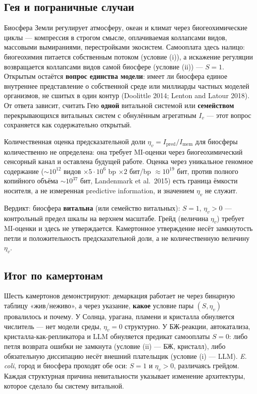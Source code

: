 \documentclass[pdflatex,sn-mathphys-ay]{sn-jnl}
\begin{document}
\subsection{Гея и пограничные случаи}\label{ux433ux435ux44f-ux438-ux43fux43eux433ux440ux430ux43dux438ux447ux43dux44bux435-ux441ux43bux443ux447ux430ux438}

Биосфера Земли регулирует атмосферу, океан и климат через биогеохимические циклы --- компрессия в строгом смысле, оплачиваемая коллапсами видов, массовыми вымираниями, перестройками экосистем. Самооплата здесь налицо: биогеохимия питается собственным потоком (условие (i)), а искажение регуляции возвращается коллапсами видов самой биосфере (условие (ii)) --- \(S = 1\). Открытым остаётся \textbf{вопрос единства модели}: имеет ли биосфера единое внутреннее представление о собственной среде или миллиарды частных моделей организмов, не сшитых в один контур (Doolittle 2014; Lenton and Latour 2018). От ответа зависит, считать Гею \textbf{одной} витальной системой или \textbf{семейством} перекрывающихся витальных систем с обнулённым агрегатным \(I_v\) --- этот вопрос сохраняется как содержательно открытый.

Количественная оценка предсказательной доли \(\eta_v = I_{\text{pred}}/I_{\text{mem}}\) для биосферы количественно не определена: она требует MI-оценки через биогеохимический сенсорный канал и оставлена будущей работе. Оценка через уникальное геномное содержание (\(\sim 10^{12}\) видов \(\times 5 \cdot 10^6\) bp \(\times 2\) бит/bp \(\approx 10^{19}\) бит, против полного копийного объёма \(\sim 10^{37}\) бит, Landenmark et al.~2015) есть граница ёмкости носителя, а не измеренная predictive information, и значением \(\eta_v\) не служит.

Вердикт: биосфера \textbf{витальна} (или семейство витальных): \(S = 1\), \(\eta_v > 0\) --- контрольный предел шкалы на верхнем масштабе. Грейд (величина \(\eta_v\)) требует MI-оценки и здесь не утверждается. Камертонное утверждение несёт замкнутость петли и положительность предсказательной доли, а не количественную величину \(\eta_v\).

\subsection{Итог по камертонам}\label{ux438ux442ux43eux433-ux43fux43e-ux43aux430ux43cux435ux440ux442ux43eux43dux430ux43c}

Шесть камертонов демонстрируют: демаркация работает не через бинарную таблицу «жив/неживо», а через указание, \textbf{какое} условие пары \((S, \eta_v)\) провалилось и почему. У Солнца, урагана, пламени и кристалла обнуляется числитель --- нет модели среды, \(\eta_v = 0\) структурно. У БЖ-реакции, автокатализа, кристалла-как-репликатора и LLM обнуляется предикат самооплаты \(S = 0\): либо петля возврата ошибки не замкнута (условие (ii) --- БЖ, кристалл), либо обязательную диссипацию несёт внешний плательщик (условие (i) --- LLM). \emph{E. coli}, город и биосфера проходят обе оси: \(S = 1\) и \(\eta_v > 0\), различаясь грейдом. Каждая структурная причина невитальности указывает изменение архитектуры, которое сделало бы систему витальной.
\end{document}
